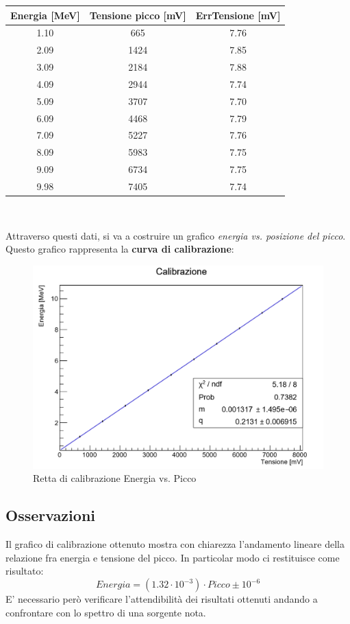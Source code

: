 \documentclass[a4paper,10pt]{article}
\begin{document}
\begin{center}
\begin{tabular}{ccc}
\toprule
Energia [MeV] & Tensione picco [mV] & ErrTensione [mV]\\
\midrule
1.10 & 665 & 7.76\\
2.09 & 1424 & 7.85\\
3.09 & 2184 & 7.88\\
4.09 & 2944 & 7.74\\
5.09 & 3707 & 7.70\\
6.09 & 4468 & 7.79\\
7.09 & 5227 & 7.76\\
8.09 & 5983 & 7.75\\
9.09 & 6734 & 7.75\\
9.98 & 7405 & 7.74\\
\bottomrule
\end{tabular}\\
\end{center}

Attraverso questi dati, si va a costruire un grafico \textit{energia vs. posizione del picco}. Questo grafico rappresenta la \textbf{curva di calibrazione}:\\

\begin{figure}[h!]
\centering
\includegraphics[scale=0.5]{rettacalibrazione.jpg}
\caption{Retta di calibrazione Energia vs. Picco}
\end{figure}

\subsection{Osservazioni}
Il grafico di calibrazione ottenuto mostra con chiarezza l'andamento lineare della relazione fra energia e tensione del picco. In particolar modo ci restituisce come risultato: 
\[
Energia = (1.32\cdot10^{-3})\cdot Picco \pm 10^{-6}
\]
E' necessario però verificare l'attendibilità dei risultati ottenuti andando a confrontare con lo spettro di una sorgente nota.
\end{document}
